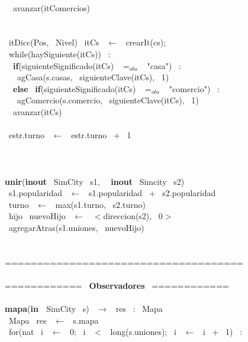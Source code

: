 \\\indent \ \indent \ avanzar(itComercios)
\\
\\\indent \ 
\\\indent \ itDicc(Pos, \ Nivel) \ itCs \ $\leftarrow$ \ crearIt(cs);
\\\indent \ while(haySiguiente(itCs)) \ :
\\\indent \ \indent \ \textbf{if}(siguienteSignificado(itCs) \ $=_{obs}$ \ "casa") \ :
\\\indent \ \indent \ \indent \ agCasa(s.casas, \ siguienteClave(itCs), \ 1)
\\\indent \ \indent \ \textbf{else} \ \textbf{if}(siguienteSignificado(itCs) \ $=_{obs}$ \ "comercio") \ :
\\\indent \ \indent \ \indent \ agComercio(s.comercio, \ siguienteClave(itCs), \ 1)
\\\indent \ \indent \ avanzar(itCs)
\\
\\\indent \ estr.turno \ $\longleftarrow$ \ estr.turno \ + \ 1 \ 
\\\noindent\makebox[\linewidth]{\rule{\textwidth}{0.4pt}}
\\
\\\noindent\makebox[\linewidth]{\rule{\textwidth}{0.4pt}}
\\\textbf{unir}(\textbf{inout} \ SimCity \ s1, \  \ \textbf{inout} \ Simcity \ s2)
\\\indent \ s1.popularidad \ $\leftarrow$ \ s1.popularidad \ + \ s2.popularidad
\\\indent \ turno \ $\leftarrow$ \ max(s1.turno, \ s2.turno)
\\\indent \ hijo \ nuevoHijo \ $\leftarrow$ \ $<$direccion(s2), \ 0$>$
\\\indent \ agregarAtras(s1.uniones, \ nuevoHijo)
\\\indent \ 
\\\noindent\makebox[\linewidth]{\rule{\textwidth}{0.4pt}}
\\===================================== \ 
\\
\\============ \ \textbf{Observadores} \ ============ \ 
\\\noindent\makebox[\linewidth]{\rule{\textwidth}{0.4pt}}
\\\textbf{mapa}(\textbf{in \ }SimCity \ s) \ $\rightarrow $ \ res \ : \ Mapa \ 
\\\indent \ Mapa \ res \ $\leftarrow$ \ s.mapa
\\\indent \ for(nat \ i \ $\leftarrow$ \ 0; \ i \ $<$ \ long(s.uniones); \ i \ $\leftarrow$ \ i \ + \ 1) \ : \ 
